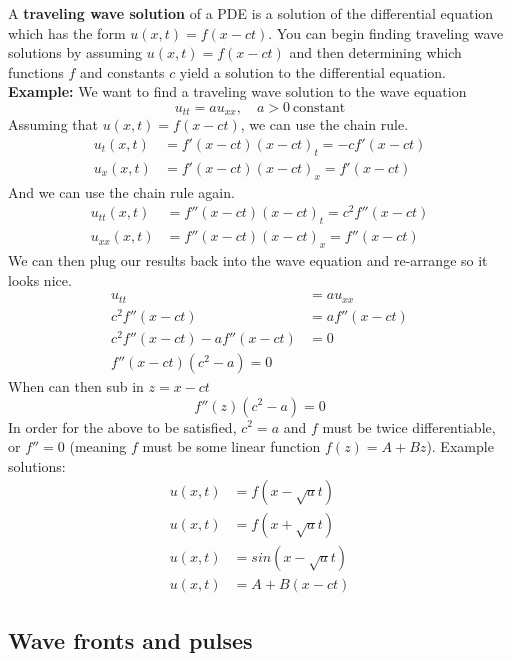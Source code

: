 \documentclass[12pt, letterpaper]{article}
\begin{document}
    A \textbf{traveling wave solution} of a PDE is a solution of the differential equation which
    has the form $u(x,t) = f(x-ct)$.
    You can begin finding traveling wave solutions by assuming $u(x,t) = f(x-ct)$ and then
    determining which functions $f$ and constants $c$ yield a solution to the differential equation.
    \\
    \newpage
    \textbf{Example:} We want to find a traveling wave solution to the wave equation
    \[
        u_{tt}=au_{xx},\quad a>0 \ \text{constant}
    \]
    Assuming that $u(x,t) = f(x-ct)$, we can use the chain rule.
    \[
        \begin{aligned}
            u_t(x,t) &= f'(x-ct)(x-ct)_t = -cf'(x-ct) \\
            u_x(x,t) &= f'(x-ct)(x-ct)_x = f'(x-ct)
        \end{aligned}
    \]
    And we can use the chain rule again.
    \[
        \begin{aligned}
            u_{tt}(x,t) &= f''(x-ct)(x-ct)_t = c^{2}f''(x-ct) \\
            u_{xx}(x,t) &= f''(x-ct)(x-ct)_x = f''(x-ct)
        \end{aligned}
    \]
    We can then plug our results back into the wave equation and re-arrange so it looks nice.
    \[
        \begin{aligned}
            u_{tt} &= au_{xx} \\
            c^{2}f''(x-ct) &= af''(x-ct) \\
            c^{2}f''(x-ct) - af''(x-ct)& = 0\\
            f''(x-ct)(c^{2}-a)=0
        \end{aligned}
    \]
    When can then sub in $z=x-ct$
    \[
        f''(z)(c^{2}-a)=0
    \]
    In order for the above to be satisfied, $c^2=a$ and $f$ must be twice differentiable, or $f''=0$
    (meaning $f$ must be some linear function $f(z)=A+Bz$).
    Example solutions:
    \[
        \begin{aligned}
            u(x,t) &= f(x- \sqrt{a} t) \\
            u(x,t) &= f(x+ \sqrt{a} t) \\
            u(x,t) &= sin(x- \sqrt{a} t)\\
            u(x,t) &= A+B(x-ct)
        \end{aligned}
    \]

    \subsection{Wave fronts and pulses}
\end{document}
